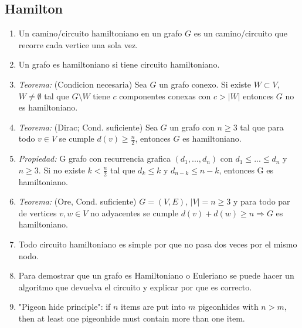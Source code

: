\subsection{Hamilton}
\begin{enumerate}
\item Un camino/circuito hamiltoniano en un grafo $G$ es un camino/circuito que recorre cada vertice una sola vez.
\item Un grafo es hamiltoniano si tiene circuito hamiltoniano.
\item \textit{Teorema:} (Condicion necesaria) Sea $G$ un grafo conexo. Si existe $ W \subset V$, $W \neq \emptyset$ tal que $G \setminus W$ tiene $c$ componentes conexas con $c > |W|$ entonces $G$ no es hamiltoniano.
\item \textit{Teorema:} (Dirac; Cond. suficiente) Sea $G$ un grafo con $n \geq 3$ tal que para todo $v \in V$ se cumple $d(v) \geq \frac{n}{2}$, entonces $G$ es hamiltoniano.
\item \textit{Propiedad:} G grafo con recurrencia grafica $(d_{1},...,d_{n})$ con $d_{1} \leq ... \leq d_{n}$ y $n \geq 3$. Si no existe $k < \frac{n}{2}$ tal que $d_{k} \leq k$ y $d_{n-k} \leq n-k$, entonces G es hamiltoniano.
\item \textit{Teorema:} (Ore, Cond. suficiente) $G=(V,E)$, $|V| = n \geq 3$ y para todo par de vertices $v,w \in V$ no adyacentes se cumple $d(v)+d(w)\geq n \Rightarrow G$ es hamiltoniano.
\item Todo circuito hamiltoniano es simple por que no pasa dos veces por el mismo nodo.
\item Para demostrar que un grafo es Hamiltoniano o Euleriano se puede hacer un algoritmo que devuelva el circuito y explicar por que es correcto.
\item "Pigeon hide principle": if $n$ items are put into $m$ pigeonhides with $n>m$, then at least one pigeonhide must contain more than one item.
\end{enumerate}
